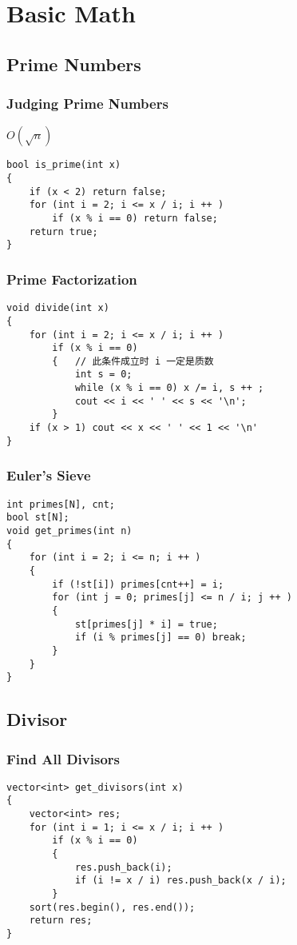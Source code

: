 \chapter{Basic Math}\label{chap:BasicMath}
\section{Prime Numbers}
\subsection{Judging Prime Numbers}
$O(\sqrt{n})$
\begin{lstlisting}
bool is_prime(int x)
{
    if (x < 2) return false;
    for (int i = 2; i <= x / i; i ++ )
        if (x % i == 0) return false;
    return true;
}
\end{lstlisting}
\subsection{Prime Factorization}
\begin{lstlisting}
void divide(int x)
{
    for (int i = 2; i <= x / i; i ++ )
        if (x % i == 0)
        {   // 此条件成⽴时 i ⼀定是质数
            int s = 0;
            while (x % i == 0) x /= i, s ++ ;
            cout << i << ' ' << s << '\n';
        }
    if (x > 1) cout << x << ' ' << 1 << '\n'
}
\end{lstlisting}
\subsection{Euler's Sieve}
\begin{lstlisting}
int primes[N], cnt;
bool st[N]; 
void get_primes(int n)
{
    for (int i = 2; i <= n; i ++ )
    {
        if (!st[i]) primes[cnt++] = i;
        for (int j = 0; primes[j] <= n / i; j ++ )
        {
            st[primes[j] * i] = true;
            if (i % primes[j] == 0) break;
        }
    }
}
\end{lstlisting}
\section{Divisor}
\subsection{Find All Divisors}
\begin{lstlisting}
vector<int> get_divisors(int x)
{
    vector<int> res;
    for (int i = 1; i <= x / i; i ++ )
        if (x % i == 0)
        {
            res.push_back(i);
            if (i != x / i) res.push_back(x / i);
        }
    sort(res.begin(), res.end());
    return res;
}
\end{lstlisting}
